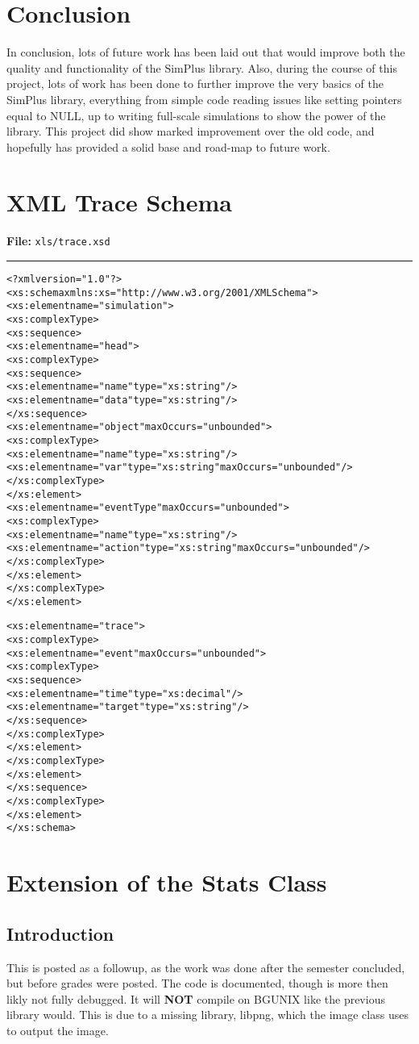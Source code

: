 \documentclass[12pt]{report}
\newcommand{\mychapter}[1]{\chapter{#1} \label{ch:#1} \thispagestyle{fancy}}
\newenvironment{file}[1]{\textbf{File:} \texttt{#1} \\ \hrule \begin{alltt} }{\end{alltt}}
\begin{document}
\mychapter{Conclusion}
	In conclusion, lots of future work has been laid out that would improve both the quality and functionality of the SimPlus library.  Also, during the course of this project, lots of work has been done to further improve the very basics of the SimPlus library, everything from simple code reading issues like setting pointers equal to NULL, up to writing full-scale simulations to show the power of the library.  This project did show marked improvement over the old code, and hopefully has provided a solid base and road-map to future work.

\appendix

\mychapter{XML Trace Schema}
\begin{file}{xls/trace.xsd}
<?xml version="1.0"?>
<xs:schema xmlns:xs="http://www.w3.org/2001/XMLSchema">
<xs:element name="simulation">
<xs:complexType>
<xs:sequence>
    <xs:element name="head">
        <xs:complexType>
        <xs:sequence>
            <xs:element name="name" type="xs:string"/>
            <xs:element name="data" type="xs:string"/>
        </xs:sequence>
        <xs:element name="object" maxOccurs="unbounded">
            <xs:complexType>
                <xs:element name="name" type="xs:string"/>
                <xs:element name="var" type="xs:string" maxOccurs="unbounded"/>
            </xs:complexType>
        </xs:element>
        <xs:element name="eventType" maxOccurs="unbounded">
            <xs:complexType>
                <xs:element name="name" type="xs:string"/>
                <xs:element name="action" type="xs:string" maxOccurs="unbounded"/>
            </xs:complexType>
        </xs:element>
        </xs:complexType>
    </xs:element>

    <xs:element name="trace">
    <xs:complexType>
        <xs:element name="event" maxOccurs="unbounded">
            <xs:complexType>
            <xs:sequence>
                <xs:element name="time" type="xs:decimal"/>
                <xs:element name="target" type="xs:string"/>
            </xs:sequence>
            </xs:complexType>
        </xs:element>
    </xs:complexType>
    </xs:element>
</xs:sequence>
</xs:complexType>
</xs:element>
</xs:schema>
\end{file}

\mychapter{Extension of the Stats Class}
\section{Introduction}
This is posted as a followup, as the work was done after the semester concluded, but before grades were posted.  The code is documented, though is more then likly not fully debugged.  It will \textbf{NOT} compile on BGUNIX like the previous library would.  This is due to a missing library, libpng, which the image class uses to output the image.
\end{document}
